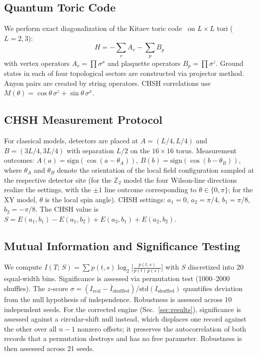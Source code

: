 \documentclass[aps,pra,twocolumn,superscriptaddress,showpacs,floatfix]{revtex4-2}
\newcommand{\Ztwo}{\mathbb{Z}_2}
\newcommand{\MI}{I(T;\,S)}
\begin{document}
\subsection{Quantum Toric Code}

We perform exact diagonalization of the Kitaev toric code~\cite{Kitaev2003} on
$L \times L$ tori ($L = 2, 3$):
\begin{equation}
  H = -\sum_v A_v - \sum_p B_p
  \label{eq:toric_code}
\end{equation}
with vertex operators $A_v = \prod \sigma^x$ and plaquette operators
$B_p = \prod \sigma^z$. Ground states in each of four topological sectors are
constructed via projector method. Anyon pairs are created by string operators.
CHSH correlations use
$M(\theta) = \cos\theta\,\sigma^z + \sin\theta\,\sigma^x$.

\subsection{CHSH Measurement Protocol}

For classical models, detectors are placed at $A = (L/4, L/4)$ and
$B = (3L/4, 3L/4)$ with separation $L/2$ on the $16 \times 16$ torus.
Measurement outcomes:
$A(a) = \mathrm{sign}(\cos(a - \theta_A))$,
$B(b) = \mathrm{sign}(\cos(b - \theta_B))$,
where $\theta_A$ and $\theta_B$ denote the orientation of the local field
configuration sampled at the respective detector site (for the $\Ztwo$ model
the four Wilson-line directions realize the settings, with the $\pm1$ line
outcome corresponding to $\theta \in \{0,\pi\}$; for the XY model, $\theta$
is the local spin angle).
CHSH settings: $a_1 = 0$, $a_2 = \pi/4$, $b_1 = \pi/8$, $b_2 = -\pi/8$.
The CHSH value is
$S = E(a_1,b_1) - E(a_1,b_2) + E(a_2,b_1) + E(a_2,b_2)$.

\subsection{Mutual Information and Significance Testing}

We compute
$\MI = \sum p(t,s) \log_2\!\big[\tfrac{p(t,s)}{p(t)\,p(s)}\big]$
with $S$ discretized into 20 equal-width bins. Significance is assessed via
permutation test (1000--2000 shuffles). The $z$-score
$\sigma = (I_\mathrm{real} - \bar{I}_\mathrm{shuffled}) / \mathrm{std}(I_\mathrm{shuffled})$
quantifies deviation from the null hypothesis of independence. Robustness is
assessed across 10 independent seeds.
For the corrected engine (Sec.~\ref{sec:results}), significance is assessed against a circular-shift null instead, which displaces one record against the other over all $n-1$ nonzero offsets; it preserves the autocorrelation of both records that a permutation destroys and has no free parameter. Robustness is then assessed across 21 seeds.
\end{document}
